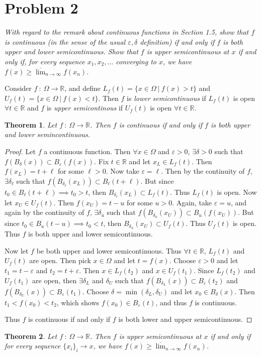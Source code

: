 \documentclass[12pt]{article}
\theoremstyle{plain}
\newtheorem{theorem}{Theorem}
\newenvironment{definition}[1][Definition]{\begin{trivlist}
\item[\hskip \labelsep {\bfseries #1}]}{\end{trivlist}}
\begin{document}
\section*{Problem 2}
\textit{With regard to the remark about continuous functions in Section 1.5, show that $f$ is continuous (in the sense of the usual $\varepsilon, \delta$ definition) if and only if $f$ is both upper and lower semicontinuous.  Show that $f$ is upper semicontinuous at $x$ if and only if, for every sequence $x_1, x_2, \dots$ converging to $x$, we have $f(x) \geq \overline{\lim}_{n\rightarrow \infty} f(x_n)$.}

\begin{definition}
    Consider $f\ :\ \Omega \rightarrow \mathbb{R}$, and define $L_f(t) = \{x \in \Omega\ |\ f(x) > t\}$ and $U_f(t) = \{x \in \Omega\ |\ f(x) < t\}$.  Then $f$ is \textit{lower semicontinuous} if $L_f(t)$ is open $\forall t \in \mathbb{R}$ and $f$ is \textit{upper semicontinous} if $U_f(t)$ is open $\forall t \in \mathbb{R}$.
\end{definition}
\begin{theorem}
    Let $f\ :\ \Omega \rightarrow \mathbb{R}$.  Then $f$ is continuous if and only if $f$ is both upper and lower semincontinuous.
\end{theorem}
\begin{proof}
    Let $f$ a continuous function.  Then $\forall x \in \Omega$ and $\varepsilon > 0$, $\exists \delta > 0$ such that $f(B_\delta(x)) \subset B_\varepsilon(f(x))$.  Fix $t \in \mathbb{R}$ and let $x_L \in L_f(t)$.  Then $f(x_L) = t + \ell$ for some $\ell > 0$.  Now take $\varepsilon = \ell$.  Then by the continuity of $f$, $\exists \delta_\ell$ such that $f(B_{\delta_\ell}(x_L)) \subset B_\ell(t + \ell)$.  But since $t_0 \in B_\ell(t + \ell) \implies t_0 > t$, then $B_{\delta_\ell}(x_L) \subset L_f(t)$.  Thus $L_f(t)$ is open.  Now let $x_U \in U_f(t)$.  Then $f(x_U) = t - u$ for some $u > 0$.  Again, take $\varepsilon = u$, and again by the continuity of $f$, $\exists \delta_u$ such that $f(B_{\delta_u}(x_U)) \subset B_u(f(x_U))$.  But since $t_0 \in B_u(t - u) \implies t_0 < t$, then $B_{\delta_u}(x_U) \subset U_f(t)$.  Thus $U_f(t)$ is open.  Thus $f$ is both upper and lower semicontinuous.

    Now let $f$ be both upper and lower semicontinuous.  Thus $\forall t \in \mathbb{R}$, $L_f(t)$ and $U_f(t)$ are open.  Then pick $x \in \Omega$ and let $t = f(x)$.  Choose $\varepsilon > 0$ and let $t_1 = t - \varepsilon$ and $t_2 = t + \varepsilon$.  Then $x \in L_f(t_2)$ and $x \in U_f(t_1)$.  Since $L_f(t_2)$ and $U_f(t_1)$ are open, then $\exists \delta_L$ and $\delta_U$ such that $f(B_{\delta_L}(x)) \subset B_\varepsilon(t_2)$ and $f(B_{\delta_U}(x)) \subset B_\varepsilon(t_1)$.  Choose $\delta = \min(\delta_L, \delta_U)$ and let $x_0 \in B_\delta(x)$.  Then $t_1 < f(x_0) < t_2$, which shows $f(x_0) \in B_\varepsilon(t)$, and thus $f$ is continuous.

    Thus $f$ is continuous if and only if $f$ is both lower and upper semicontinuous.
\end{proof}

\begin{theorem}
    Let $f\ :\ \Omega \rightarrow \mathbb{R}$.  Then $f$ is upper semicontinuous at $x$ if and only if for every sequence $\{x_i\}_i \rightarrow x$, we have $f(x) \geq \overline{\lim}_{n\rightarrow \infty}f(x_n)$.
\end{theorem}
\end{document}
